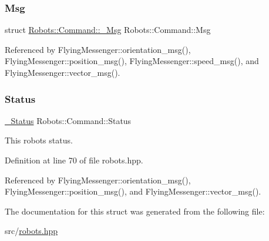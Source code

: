 \subsubsection{\texorpdfstring{Msg}{Msg}}
{\footnotesize\ttfamily struct \hyperlink{struct_robots_1_1_command_1_1___msg}{Robots\+::\+Command\+::\+\_\+\+Msg}  Robots\+::\+Command\+::\+Msg}



Referenced by Flying\+Messenger\+::orientation\+\_\+msg(), Flying\+Messenger\+::position\+\_\+msg(), Flying\+Messenger\+::speed\+\_\+msg(), and Flying\+Messenger\+::vector\+\_\+msg().

\mbox{\label{struct_robots_1_1_command_afdad6756a7987d5b8c76ea66fd681d10}} 
\subsubsection{\texorpdfstring{Status}{Status}}
{\footnotesize\ttfamily \hyperlink{struct_robots_1_1___status}{\+\_\+\+Status} Robots\+::\+Command\+::\+Status}



This robot\textquotesingle{}s status. 



Definition at line 70 of file robots.\+hpp.



Referenced by Flying\+Messenger\+::orientation\+\_\+msg(), Flying\+Messenger\+::position\+\_\+msg(), and Flying\+Messenger\+::vector\+\_\+msg().



The documentation for this struct was generated from the following file\+:\begin{DoxyCompactItemize}
\item 
src/\hyperlink{robots_8hpp}{robots.\+hpp}\end{DoxyCompactItemize}
